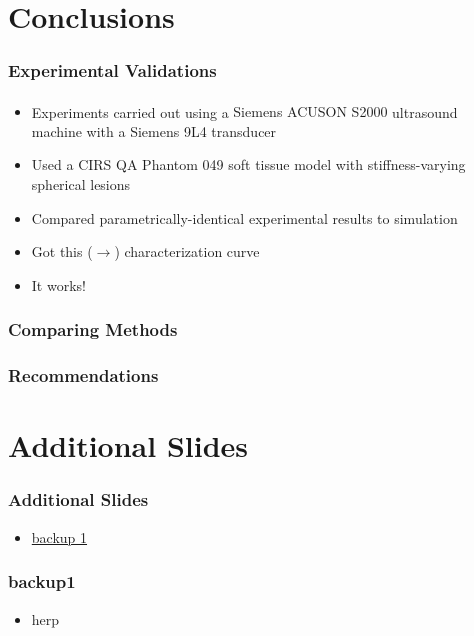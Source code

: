 \documentclass{beamer}
\begin{document}
	\section{Conclusions}
		\begin{frame}
			\frametitle{Experimental Validations}
			\begin{itemize}
				\item Experiments carried out using a \alert{Siemens ACUSON S2000\textsuperscript{\texttrademark}} ultrasound machine with a \alert{Siemens 9L4} transducer
				\item Used a \alert{CIRS QA Phantom 049} soft tissue model with stiffness-varying spherical lesions
				\item Compared parametrically-identical experimental results to simulation
				\item Got this ($\rightarrow$) characterization curve
				\item It works!
			\end{itemize}
		\end{frame}

		\begin{frame}
			\frametitle{Comparing Methods}
		\end{frame}

		\begin{frame}
			\frametitle{Recommendations}
		\end{frame}

	\appendix
	\section{Additional Slides}
	\setcounter{showProgressBar}{0}
	\setcounter{showSlideNumbers}{0}

		\begin{frame}
			\frametitle{Additional Slides}
			\begin{itemize}
				\item \hyperlink{backup1}{backup 1}
			\end{itemize}
		\end{frame}

		\begin{frame}[label=backup1]
			\frametitle{backup1}
			\begin{itemize}
				\item herp
			\end{itemize}
		\end{frame}
\end{document}
